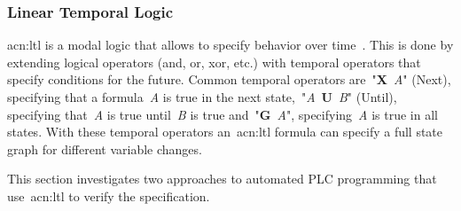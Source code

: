 \subsubsection{Linear Temporal Logic}
\label{sec:sub:ltl}

\acrfull{acn:ltl} is a modal logic that allows to specify behavior over time~\cite{4567924}.
This is done by extending logical operators (and, or, xor, etc.) with temporal operators that specify conditions for the future.
Common temporal operators are~"\textbf{X}~\textit{A}" (Next), specifying that a formula~\textit{A} is true in the next state,~"\textit{A}~\textbf{U}~\textit{B}" (Until), specifying that~\textit{A} is true until~\textit{B} is true and~"\textbf{G}~\textit{A}", specifying~\textit{A} is true in all states.
With these temporal operators an~\acrshort{acn:ltl} formula can specify a full state graph for different variable changes.

This section investigates two approaches to automated PLC programming that use~\acrshort{acn:ltl} to verify the specification.

